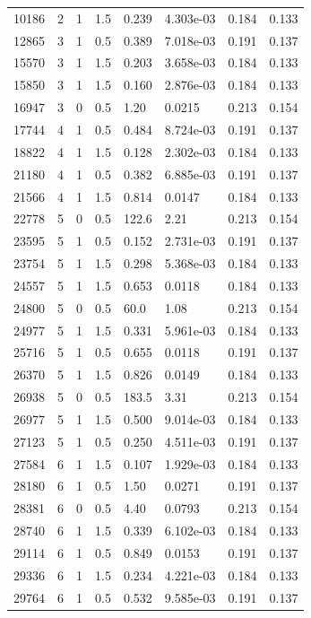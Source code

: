 \documentclass[preview]{standalone}
\begin{document}
{{\begin{tabular}{L{1.2cm}C{1.2cm} C{0.3cm}C{0.5cm} C{1.4cm}C{1.4cm} C{1.4cm}C{1.4cm}}
  10186  &     2  & 1     & 1.5 &  0.239  & 4.303e-03  & 0.184 &  0.133   \\ 
  12865  &     3  & 1     & 0.5 &  0.389  & 7.018e-03  & 0.191 &  0.137   \\ 
  15570  &     3  & 1     & 1.5 &  0.203  & 3.658e-03  & 0.184 &  0.133   \\ 
  15850  &     3  & 1     & 1.5 &  0.160  & 2.876e-03  & 0.184 &  0.133   \\ 
  16947  &     3  & 0     & 0.5 &  1.20  & 0.0215  & 0.213 &  0.154   \\ 
  17744  &     4  & 1     & 0.5 &  0.484  & 8.724e-03  & 0.191 &  0.137   \\ 
  18822  &     4  & 1     & 1.5 &  0.128  & 2.302e-03  & 0.184 &  0.133   \\ 
  21180  &     4  & 1     & 0.5 &  0.382  & 6.885e-03  & 0.191 &  0.137   \\ 
  21566  &     4  & 1     & 1.5 &  0.814  & 0.0147  & 0.184 &  0.133   \\ 
  22778  &     5  & 0     & 0.5 &  122.6  & 2.21  & 0.213 &  0.154   \\ 
  23595  &     5  & 1     & 0.5 &  0.152  & 2.731e-03  & 0.191 &  0.137   \\ 
  23754  &     5  & 1     & 1.5 &  0.298  & 5.368e-03  & 0.184 &  0.133   \\ 
  24557  &     5  & 1     & 1.5 &  0.653  & 0.0118  & 0.184 &  0.133   \\ 
  24800  &     5  & 0     & 0.5 &  60.0  & 1.08  & 0.213 &  0.154   \\ 
  24977  &     5  & 1     & 1.5 &  0.331  & 5.961e-03  & 0.184 &  0.133   \\ 
  25716  &     5  & 1     & 0.5 &  0.655  & 0.0118  & 0.191 &  0.137   \\ 
  26370  &     5  & 1     & 1.5 &  0.826  & 0.0149  & 0.184 &  0.133   \\ 
  26938  &     5  & 0     & 0.5 &  183.5  & 3.31  & 0.213 &  0.154   \\ 
  26977  &     5  & 1     & 1.5 &  0.500  & 9.014e-03  & 0.184 &  0.133   \\ 
  27123  &     5  & 1     & 0.5 &  0.250  & 4.511e-03  & 0.191 &  0.137   \\ 
  27584  &     6  & 1     & 1.5 &  0.107  & 1.929e-03  & 0.184 &  0.133   \\ 
  28180  &     6  & 1     & 0.5 &  1.50  & 0.0271  & 0.191 &  0.137   \\ 
  28381  &     6  & 0     & 0.5 &  4.40  & 0.0793  & 0.213 &  0.154   \\ 
  28740  &     6  & 1     & 1.5 &  0.339  & 6.102e-03  & 0.184 &  0.133   \\ 
  29114  &     6  & 1     & 0.5 &  0.849  & 0.0153  & 0.191 &  0.137   \\ 
  29336  &     6  & 1     & 1.5 &  0.234  & 4.221e-03  & 0.184 &  0.133   \\ 
  29764  &     6  & 1     & 0.5 &  0.532  & 9.585e-03  & 0.191 &  0.137   \\ 
\hline 
\end{tabular} 

}}
\end{document}
